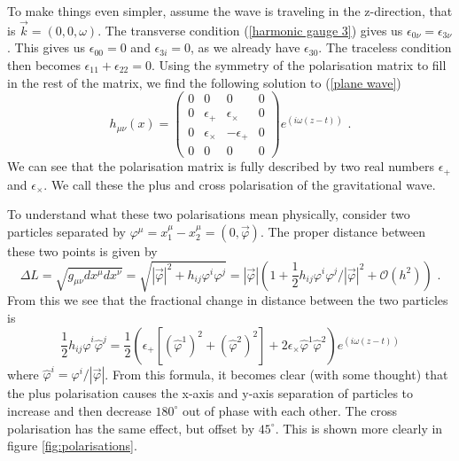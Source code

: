 \documentclass[11pt]{cuthesis}
\newcommand{\mn}{_{\mu\nu}}
\newcommand{\fs}{\text{ .}}
\begin{document}
To make things even simpler, assume the wave is traveling in the z-direction, that is $\vec{k} = (0,0,\omega)$. The transverse condition (\ref{harmonic gauge 3}) gives us $\epsilon_{0\nu} = \epsilon_{3\nu}$. This gives us $\epsilon_{0 0}= 0$ and $\epsilon_{3 i} = 0$, as we already have $\epsilon_{3 0}$. The traceless condition then becomes $\epsilon_{1 1} + \epsilon_{2 2} = 0$. Using the symmetry of the polarisation matrix to fill in the rest of the matrix, we find the following solution to (\ref{plane wave})
\begin{equation}\label{gw solution}
h\mn (x)
=
\begin{pmatrix} 
0 & 0 & 0 & 0 \\
0 & \epsilon_+ & \epsilon_\times & 0 \\
0 & \epsilon_\times & -\epsilon_+ & 0 \\
0 & 0 & 0 & 0 
\end{pmatrix}
e^{(i\omega (z-t))} \fs
\end{equation}
We can see that the polarisation matrix is fully described by two real numbers $\epsilon_+$ and $\epsilon_\times$. We call these the plus and cross polarisation of the gravitational wave.

To understand what these two polarisations mean physically, consider two particles separated by $\varphi^\mu = x_1^\mu - x_2^\mu = (0,\vec{\varphi})$. The proper distance between these two points is given by
\begin{equation} \label{deltaL}
\Delta L = \sqrt{g\mn dx^\mu dx^\nu} = \sqrt{|\vec{\varphi}|^2 + h_{ij}\varphi^i \varphi^j} = | \vec{\varphi} | (1 + \frac{1}{2}h_{ij}\varphi^i \varphi^j / |\vec{\varphi}|^2 + \mathcal{O}(h^2) ) \fs
\end{equation} 
From this we see that the fractional change in distance between the two particles is
\begin{equation}
\frac{1}{2}h_{ij}\hat{\varphi}^i \hat{\varphi}^j = \frac{1}{2}\left( \epsilon_+ \left[ (\hat{\varphi}^1)^2 + (\hat{\varphi}^2)^2 \right] +2\epsilon_\times \hat{\varphi}^1\hat{\varphi}^2 \right) e^{(i\omega (z-t))}
\end{equation}
where $\hat{\varphi}^i = \varphi^i/|\vec{\varphi}|$. From this formula, it becomes clear (with some thought) that the plus polarisation causes the x-axis and y-axis separation of particles to increase and then decrease $180^\circ$ out of phase with each other. The cross polarisation has the same effect, but offset by $45^\circ$. This is shown more clearly in figure \ref{fig:polarisations}. 
\end{document}
